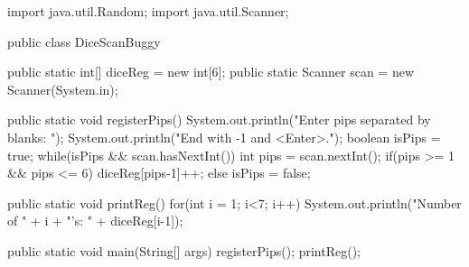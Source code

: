 \SubtaskSolved

\begin{Code}[language=Java,numbers=left]
import java.util.Random;
import java.util.Scanner;

public class DiceScanBuggy {
	public static int[] diceReg = new int[6];
	public static Scanner scan = new Scanner(System.in);

	public static void registerPips() {
		System.out.println("Enter pips separated by blanks: ");
		System.out.println("End with -1 and <Enter>.");
		boolean isPips = true;
		while(isPips && scan.hasNextInt()){
			int pips = scan.nextInt();
			if(pips >= 1 && pips <= 6) {
				diceReg[pips-1]++;
			} else {
				isPips = false;
			}
		}
	}

	public static void printReg(){
		for(int i = 1; i<7; i++) {
		System.out.println("Number of " + i + "'s: " + diceReg[i-1]);
		}
	}

	public static void main(String[] args) {
		registerPips();
		printReg();
	}
}
\end{Code}

\QUESTEND
